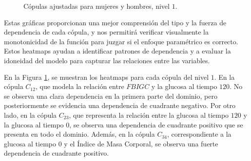 \begin{figure}[H]
 \centering
    \caption{Cópulas ajustadas para mujeres y hombres, nivel $1$.}
    \label{fig:Modelo4TotalNivel1}
\end{figure}

Estas gráficas proporcionan una mejor comprensión del tipo y la fuerza de dependencia de cada cópula, y nos permitirá verificar visualmente la monotonicidad de la función para juzgar si el enfoque paramétrico es correcto. Estos heatmaps ayudan a identificar patrones de dependencia y a evaluar la idoneidad del modelo para capturar las relaciones entre las variables.

En la Figura \ref{fig:Modelo4TotalNivel1}, se muestran los heatmaps para cada cópula del nivel $1$. En la cópula $C_{12}$, que modela la relación entre $FBIGC$ y la glucosa al tiempo $120$. No se observa una clara dependencia en la primera parte del dominio, pero posteriormente se evidencia una dependencia de cuadrante negativo. Por otro lado, en la cópula $C_{23}$, que representa la relación entre la glucosa al tiempo $120$ y la glucosa al tiempo $0$, se observa una dependencia de cuadrante positivo que se presenta en todo el dominio. Además, en la cópula $C_{34}$, correspondiente a la glucosa al tiempo $0$ y el Índice de Masa Corporal, se observa una fuerte dependencia de cuadrante positivo.

